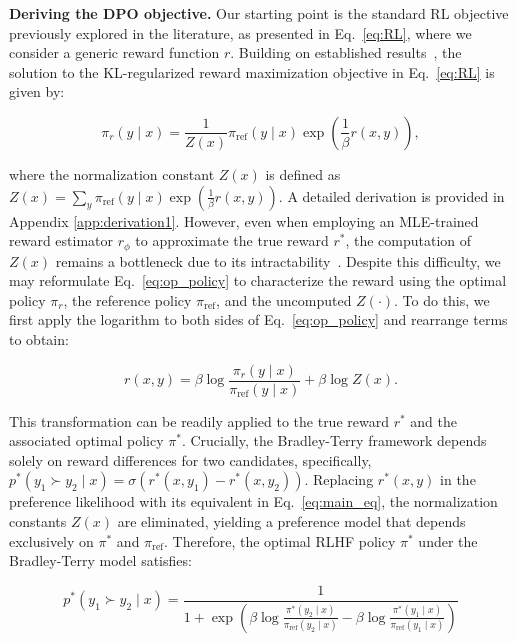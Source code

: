 \textbf{Deriving the DPO objective.} Our starting point is the standard RL objective previously explored in the literature, as presented in Eq.~\ref{eq:RL}, where we consider a generic reward function $r$. Building on established results~\citep{peters2007reinforcement, peng2019advantage, korbak2022reinforcement, go2023aligning}, the solution to the KL-regularized reward maximization objective in Eq.~\ref{eq:RL} is given by:

\begin{equation}\label{eq:op_policy}
    \pi_r(y\mid x) = \frac{1}{Z(x)}\pi_\text{ref}(y\mid x)\exp\left(\frac{1}{\beta}r(x, y)\right),
\end{equation}

where the normalization constant $Z(x)$ is defined as $Z(x) =\sum_{y}\pi_\text{ref}(y\mid x)\exp\left(\frac{1}{\beta}r(x, y)\right)$. A detailed derivation is provided in Appendix \ref{app:derivation1}. However, even when employing an MLE-trained reward estimator $r_\phi$ to approximate the true reward $r^*$, the computation of $Z(x)$ remains a bottleneck due to its intractability~\citep{korbak2022reinforcement, go2023aligning}. Despite this difficulty, we may reformulate Eq.~\ref{eq:op_policy} to characterize the reward using the optimal policy $\pi_r$, the reference policy $\pi_\text{ref}$, and the uncomputed $Z(\cdot)$. To do this, we first apply the logarithm to both sides of Eq.~\ref{eq:op_policy} and rearrange terms to obtain:

\begin{equation}\label{eq:main_eq}
    r(x,y) =\beta \log \frac{\pi_r(y\mid x)}{\pi_\text{ref}(y\mid x)} + \beta \log Z(x).
\end{equation}

This transformation can be readily applied to the true reward $r^*$ and the associated optimal policy $\pi^*$. Crucially, the Bradley-Terry framework depends solely on reward differences for two candidates, specifically, ${p^*(y_1 \succ y_2 \mid x) = \sigma(r^*(x, y_1) - r^*(x, y_2))}$. Replacing $r^*(x,y)$ in the preference likelihood with its equivalent in Eq.~\ref{eq:main_eq}, the normalization constants $Z(x)$ are eliminated, yielding a preference model that depends exclusively on $\pi^*$ and $\pi_\text{ref}$. Therefore, the optimal RLHF policy $\pi^*$ under the Bradley-Terry model satisfies:

\begin{equation}\label{eq:objective}
    p^*(y_1\succ y_2 \mid x)=\frac{1}{1 + \exp\left(\beta \log \frac{\pi^*(y_2\mid x)}{\pi_\text{ref}(y_2\mid x)} - \beta \log \frac{\pi^*(y_1\mid x)}{\pi_\text{ref}(y_1\mid x)}\right)}
\end{equation}

